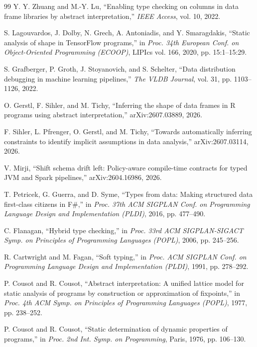 \documentclass[conference]{IEEEtran}
\begin{document}
\begin{thebibliography}{99}
Y. Y. Zhuang and M.-Y. Lu, ``Enabling type checking on columns in data frame libraries by abstract
interpretation,'' \emph{IEEE Access}, vol. 10, 2022.

S. Lagouvardos, J. Dolby, N. Grech, A. Antoniadis, and Y. Smaragdakis, ``Static analysis of shape in
TensorFlow programs,'' in \emph{Proc. 34th European Conf. on Object-Oriented Programming (ECOOP)},
LIPIcs vol. 166, 2020, pp. 15:1--15:29.

S. Grafberger, P. Groth, J. Stoyanovich, and S. Schelter, ``Data distribution debugging in machine
learning pipelines,'' \emph{The VLDB Journal}, vol. 31, pp. 1103--1126, 2022.

O. Gerstl, F. Sihler, and M. Tichy, ``Inferring the shape of data frames in R programs using
abstract interpretation,'' arXiv:2607.03889, 2026.

F. Sihler, L. Pfrenger, O. Gerstl, and M. Tichy, ``Towards automatically inferring constraints to
identify implicit assumptions in data analysis,'' arXiv:2607.03114, 2026.

V. Mirji, ``Shift schema drift left: Policy-aware compile-time contracts for typed JVM and Spark
pipelines,'' arXiv:2604.16986, 2026.

T. Petricek, G. Guerra, and D. Syme, ``Types from data: Making structured data first-class citizens
in F\#,'' in \emph{Proc. 37th ACM SIGPLAN Conf. on Programming Language Design and Implementation
(PLDI)}, 2016, pp. 477--490.

C. Flanagan, ``Hybrid type checking,'' in \emph{Proc. 33rd ACM SIGPLAN-SIGACT Symp. on Principles
of Programming Languages (POPL)}, 2006, pp. 245--256.

R. Cartwright and M. Fagan, ``Soft typing,'' in \emph{Proc. ACM SIGPLAN Conf. on Programming
Language Design and Implementation (PLDI)}, 1991, pp. 278--292.

P. Cousot and R. Cousot, ``Abstract interpretation: A unified lattice model for static analysis of
programs by construction or approximation of fixpoints,'' in \emph{Proc. 4th ACM Symp. on
Principles of Programming Languages (POPL)}, 1977, pp. 238--252.

P. Cousot and R. Cousot, ``Static determination of dynamic properties of programs,'' in \emph{Proc.
2nd Int. Symp. on Programming}, Paris, 1976, pp. 106--130.


\end{thebibliography}
\end{document}

